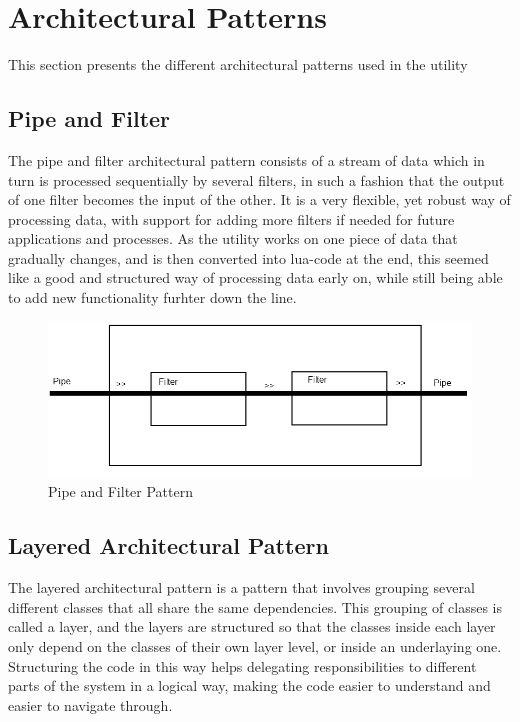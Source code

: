 \section{Architectural Patterns}
This section presents the different architectural patterns used in the \gls{utility}

\subsection{Pipe and Filter}
The pipe and filter architectural pattern consists of a stream of data which in turn is processed sequentially by several filters, in such a fashion that the output of one filter becomes the input of the other. It is a very flexible, yet robust way of processing data, with support for adding more filters if needed for future applications and processes. As the \gls{utility} works on one piece of data that gradually changes, and is then converted into \Gls{lua}-code at the end, this seemed like a good and structured way of processing data early on, while still being able to add new functionality furhter down the line.

\begin{figure}[htb]
	\includegraphics[width=\textwidth]{./planning/img/PipeAndFilter}
	\caption{Pipe and Filter Pattern\label{fig:pipefilter}}
\end{figure}

\subsection{Layered Architectural Pattern}
\label{sec:Layered}
The layered architectural pattern is a pattern that involves grouping several different classes that all share the same dependencies. This grouping of classes is called a layer, and the layers are structured so that the classes inside each layer only depend on the classes of their own layer level, or inside an underlaying one. Structuring the code in this way helps delegating responsibilities to different parts of the system in a logical way, making the code easier to understand and easier to navigate through.

